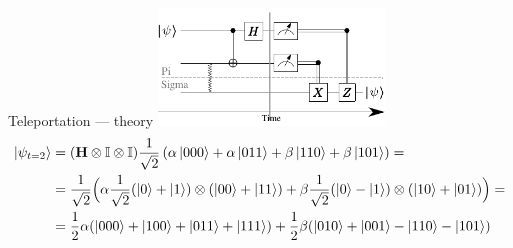 \begin{frame}{Teleportation --- theory}
    \centering
	\includegraphics[width=0.45\textwidth]{pics/teleportation/teleportation_t2}
	\begin{equation*}
		\begin{split}
			\ket{\psi_{t=2}} &=( \mathbf{H}\otimes\mathbb{I}\otimes\mathbb{I}) \frac{1}{\sqrt{2}} \left(\alpha \ket{000} + \alpha \ket{011} + \beta \ket{110} + \beta \ket{101}  \right) =\\
			&= \frac{1}{\sqrt{2}} \Big(
			\alpha \frac{1}{\sqrt{2}}(\ket{0}+\ket{1})\otimes (\ket{00} +  \ket{11}) + \beta \frac{1}{\sqrt{2}}(\ket{0}-\ket{1})\otimes(\ket{10} + \ket{01}) \Big) =\\
			&= \frac{1}{2} \alpha(\ket{000} + \ket{100}  + \ket{011} + \ket{111}) + \frac{1}{2}\beta (\ket{010} + \ket{001} - \ket{110} - \ket{101})
		\end{split}
	\end{equation*}
\end{frame}

